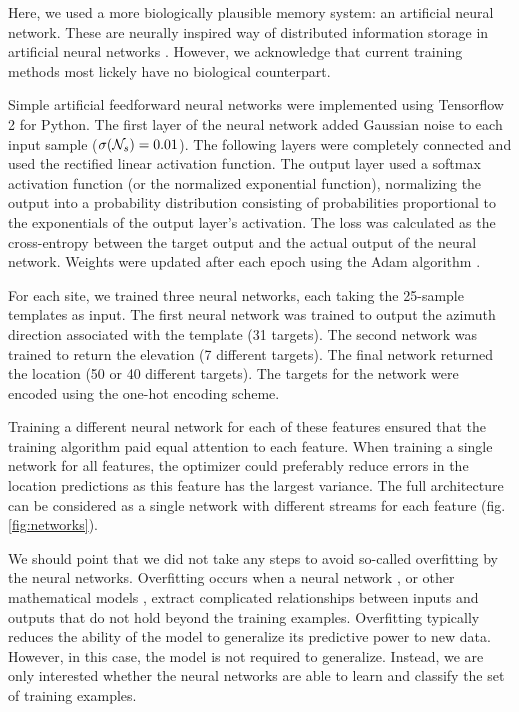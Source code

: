\documentclass[preprint,5p]{elsarticle}
\begin{document}
Here, we used a more biologically plausible memory system: an artificial neural network. These are neurally inspired way of distributed information storage in artificial neural networks \citep{Mcleod1998}. However, we acknowledge that current training methods most lickely have no biological counterpart.

Simple artificial feedforward neural networks were implemented using Tensorflow 2 for Python. The first layer of the neural network added Gaussian noise to each input sample ($\sigma(\mathcal{N}_s) = 0.01$). The following layers were completely connected and used the rectified linear activation function. The output layer used a softmax activation function (or the normalized exponential function), normalizing the output into a probability distribution consisting of probabilities proportional to the exponentials of the output layer's activation. The loss was calculated as the cross-entropy between the target output and the actual output of the neural network. Weights were updated after each epoch using the Adam algorithm \citep{Kingma2014} .

For each site, we trained three neural networks, each taking the 25-sample templates as input. The first neural network was trained to output the azimuth direction associated with the template (31 targets). The second network was trained to return the elevation (7 different targets). The final network returned the location (50 or 40 different targets). The targets for the network were encoded using the one-hot encoding scheme. 

Training a different neural network for each of these features ensured that the training algorithm paid equal attention to each feature. When training a single network for all features, the optimizer could preferably reduce errors in the location predictions as this feature has the largest variance. The full architecture can be considered as a single network with different streams for each feature (fig. \ref{fig:networks}).

We should point that we did not take any steps to avoid so-called overfitting by the neural networks. Overfitting occurs when a neural network \citep{Ghotra2017}, or other mathematical models \citep{Hawkins2004}, extract  complicated relationships between inputs and outputs that do not hold beyond the training examples. Overfitting typically reduces the ability of the model to generalize its predictive power to new data. However, in this case, the model is not required to generalize. Instead, we are only interested whether the neural networks are able to learn and classify the set of training examples.
\end{document}
